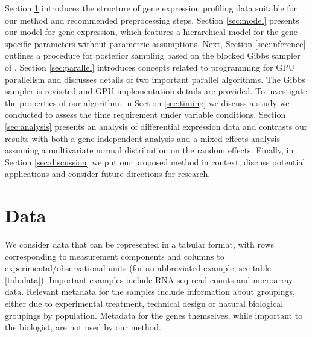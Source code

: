 Section \ref{sec:data} introduces the structure of gene expression profiling data suitable for our method and recommended preprocessing steps. Section \ref{sec:model} presents our model for gene expression, which features a hierarchical model for the gene-specific parameters without parametric assumptions. Next, Section \ref{sec:inference} outlines a procedure for posterior sampling based on the blocked Gibbs sampler of \cite{ishwaran2000}. Section \ref{sec:parallel} introduces concepts related to programming for GPU parallelism and discusses details of two important parallel algorithms. The Gibbs sampler is revisited and GPU implementation details are provided. To investigate the properties of our algorithm, in Section \ref{sec:timing} we discuss a study we conducted to assess the time requirement under variable conditions. Section \ref{sec:analysis} presents an analysis of differential expression data and contrasts our results with both a gene-independent analysis and a mixed-effects analysis assuming a multivariate normal distribution on the random effects. Finally, in Section \ref{sec:discussion} we put our proposed method in context, discuss potential applications and consider future directions for research.
\section{Data}
\label{sec:data}
We consider data that can be represented in a tabular format, with rows corresponding to measurement components and columns to experimental/observational units (for an abbreviated example, see table \ref{tab:data}). Important examples include RNA-seq read counts and microarray data. Relevant metadata for the samples include information about groupings, either due to experimental treatment, technical design or natural biological groupings by population. Metadata for the genes themselves, while important to the biologist, are not used by our method.

